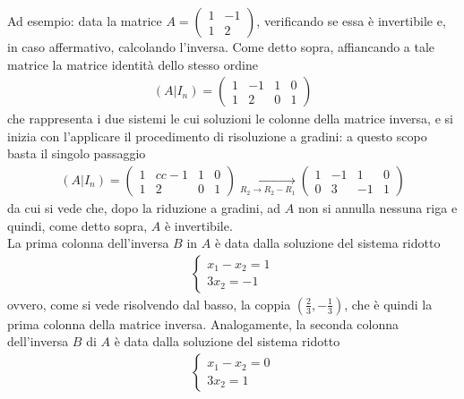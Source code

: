 \documentclass{book}
\theoremstyle{definition}
\theoremstyle{plain}
\begin{document}
Ad esempio: data la matrice $A=
\begin{pmatrix}
  1 & -1\\
  1 & 2
\end{pmatrix}
$, verificando se essa è invertibile e, in caso affermativo,
calcolando l'inversa. Come detto sopra, affiancando a tale matrice
la matrice identità dello stesso ordine
\begin{eqnarray*}
  (A|I_n)=\left(
  \begin{array}{cc|cc}
    1 & -1 & 1 & 0\\
    1 &  2 & 0 & 1
  \end{array}
  \right)
\end{eqnarray*}
che rappresenta i due sistemi le cui soluzioni le colonne della
matrice inversa, e si inizia con l'applicare il procedimento di
risoluzione a gradini: a questo scopo basta il singolo passaggio
\begin{eqnarray}
  \label{eq:Compinveeproddimatrici13}
  (A|I_n)=\left(
  \begin{array}{cc|cc}
    1 & cc-1 & 1 & 0 \\
    1 & 2 & 0 & 1
  \end{array}\right) \underset{R_2\to R_2-R_1}{\to}\left(
  \begin{array}{cc|cc}
    1 & -1 & 1 & 0\\
    0 & 3 & -1 & 1
  \end{array}\right)
\end{eqnarray}
da cui si vede che, dopo la riduzione a gradini, ad $A$ non si
annulla nessuna riga e quindi, come detto sopra, $A$ è
invertibile.\\
La prima colonna dell'inversa $B$ in $A$ è data dalla soluzione del
sistema ridotto
\begin{eqnarray}
  \label{eq:Compinveeproddimatrici14}
  \begin{cases}
    x_1-x_2=1\\
    3x_2=-1
  \end{cases}
\end{eqnarray}
ovvero, come si vede risolvendo dal basso, la coppia
$\left(\frac{2}{3},-\frac{1}{3}\right)$, che è quindi la prima
colonna della matrice inversa. Analogamente, la seconda colonna
dell'inversa $B$ di $A$ è data dalla soluzione del sistema ridotto
\begin{eqnarray}
  \label{eq:Compinveeproddimatrici15}
  \begin{cases}
    x_1-x_2=0\\
    3x_2=1
  \end{cases}
\end{eqnarray}
\end{document}
